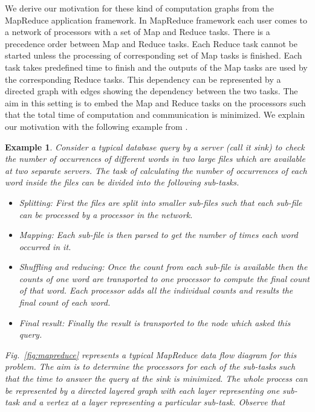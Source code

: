 \documentclass[journal]{IEEEtran}
\newtheorem{example}{{\bf Example}}
\begin{document}
We derive our motivation for these kind of computation graphs from the
MapReduce application framework. In MapReduce framework each user
comes to a network of processors with a set of Map and Reduce
tasks. There is a precedence order between Map and Reduce tasks. Each
Reduce task cannot be started unless the processing of corresponding
set of Map tasks is finished. Each task takes predefined time to
finish and the outputs of the Map tasks are used by the corresponding
Reduce tasks. This dependency can be represented by a directed graph
with edges showing the dependency between the two tasks. The aim in
this setting is to embed the Map and Reduce tasks on the processors
such that the total time of computation and communication is
minimized. We explain our motivation with the following example from
\cite{Dean04}.

\begin{example}
  \label{ex:mapreduce}
  Consider a typical database query by a server (call it sink) to
  check the number of occurrences of different words in two large
  files which are available at two separate servers. The
  task of calculating the number of occurrences of each word inside
  the files can be divided into the following sub-tasks.
\begin{itemize}
  \item \textit{Splitting:} First the files are split into smaller
    sub-files such that each sub-file can be processed by a processor
    in the network.
  \item \textit{Mapping:} Each sub-file is then parsed to get the
    number of times each word occurred in it.
  \item \textit{Shuffling and reducing:} Once the count from each
    sub-file is available then the counts of one word are transported
    to one processor to compute the final count of that word. Each
    processor adds all the individual counts and results the final
    count of each word.
   \item \textit{Final result:} Finally the result is transported to
    the node which asked this query.
  \end{itemize}
Fig.~\ref{fig:mapreduce} represents a typical MapReduce data flow
  diagram for this problem. The aim is to determine the processors for
  each of the sub-tasks such that the time to answer the query at the
  sink is minimized. The whole process can be represented by a
  directed layered graph with each layer representing one sub-task and
  a vertex at a layer representing a particular sub-task. Observe that

\end{example}
\end{document}

